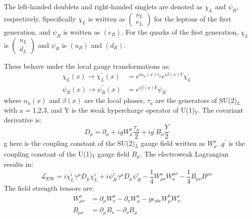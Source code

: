 The left-handed doublets and right-handed singlets are denoted as $\chi_{L}$ and $\psi_{R}$, respectively. Specifically $\chi_{L}$ is written as 
$
\left(\begin{array}{c}
\nu_{L} \\
e_{L}
\end{array}\right)
$
for the leptons of the first generation, and $\psi_{R}$ is written as $(e_R)$.
For the quarks of the first generation, $\chi_{L}$ is 
$
\left(\begin{array}{c}
u_{L} \\
d_{L}
\end{array}\right)
$
and $\psi_{R}$ is $(u_R)$ and $(d_R)$.




These behave under the local gauge transformations as:
\begin{equation}
\begin{aligned}
\chi_{L}(x) \rightarrow \chi_{L}^{\prime}(x) &=e^{i \alpha_{a}(x) \tau_{a}} e^{i \beta(x) Y} \chi_{L} \\
\psi_{R}(x) \rightarrow \psi_{R}^{\prime}(x) &=e^{i \beta(x) Y} \psi_{R}
\end{aligned}
\end{equation}
where $\alpha_{a}(x)$ and $\beta(x)$ are the local phases, $\tau_{a}$ are the generators of SU(2)$_L$ with a = 1,2,3, and Y is the weak hypercharge operator of U(1)$_Y$. The covariant derivative is:
\begin{equation}
D_{\mu}=\partial_{\mu}+i g W_{\mu}^{a} \frac{\tau_{a}}{2}+i g^{\prime} B_{\mu} \frac{Y}{2}
\end{equation}
g here is the coupling constant of the SU(2)$_L$ gauge field written as $W_{\mu}^{a}$. $g^{\prime}$ is the coupling constant of the U(1)$_Y$ gauge field $B_{\mu}$.
The electroweak Lagrangian results in:
\begin{equation}
\mathcal{L}_{\mathrm{EW}}=i \overline{\chi_{L}^{i}} \gamma^{\mu} D_{\mu} \chi_{L}^{i}+i \overline{\psi_{R}^{i}} \gamma^{\mu} D_{\mu} \psi_{R}^{i}-\frac{1}{4} W_{\mu \nu}^{a} W_{a}^{\mu \nu}-\frac{1}{4} B_{\mu \nu} B^{\mu \nu}
\end{equation}
The field strength tensors are:
\begin{equation}
\begin{aligned}
W_{\mu \nu}^{a} &=\partial_{\mu} W_{\nu}^{a}-\partial_{\nu} W_{\mu}^{a}-g \epsilon_{a b c} W_{\mu}^{b} W_{\nu}^{c} \\
B_{\mu \nu} &=\partial_{\mu} B_{\nu}-\partial_{\nu} B_{\mu}
\end{aligned}
\end{equation}
